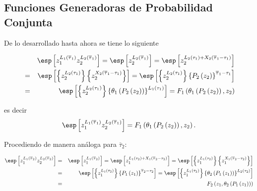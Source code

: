 \subsection{Funciones Generadoras de Probabilidad Conjunta}


De lo desarrollado hasta ahora se tiene lo siguiente

\begin{eqnarray*}
&&\esp\left[z_{1}^{L_{1}\left(\overline{\tau}_{1}\right)}z_{2}^{L_{2}\left(\overline{\tau}_{1}\right)}\right]=\esp\left[z_{2}^{L_{2}\left(\overline{\tau}_{1}\right)}\right]=\esp\left[z_{2}^{L_{2}\left(\tau_{1}\right)+X_{2}\left(\overline{\tau}_{1}-\tau_{1}\right)}\right]\\
&=&\esp\left[\left\{z_{2}^{L_{2}\left(\tau_{1}\right)}\right\}\left\{z_{2}^{X_{2}\left(\overline{\tau}_{1}-\tau_{1}\right)}\right\}\right]=\esp\left[\left\{z_{2}^{L_{2}\left(\tau_{1}\right)}\right\}\left\{P_{2}\left(z_{2}\right)\right\}^{\overline{\tau}_{1}-\tau_{1}}\right]\\
&=&\esp\left[\left\{z_{2}^{L_{2}\left(\tau_{1}\right)}\right\}\left\{\theta_{1}\left(P_{2}\left(z_{2}\right)\right)\right\}^{L_{1}\left(\tau_{1}\right)}\right]=F_{1}\left(\theta_{1}\left(P_{2}\left(z_{2}\right)\right),z_{2}\right)
\end{eqnarray*}

es decir %
\begin{equation}\label{Eq.base.F1}
\esp\left[z_{1}^{L_{1}\left(\overline{\tau}_{1}\right)}z_{2}^{L_{2}\left(\overline{\tau}_{1}\right)}\right]=F_{1}\left(\theta_{1}\left(P_{2}\left(z_{2}\right)\right),z_{2}\right).
\end{equation}

Procediendo de manera an\'aloga para $\overline{\tau}_{2}$:

\begin{eqnarray*}
\esp\left[z_{1}^{L_{1}\left(\overline{\tau}_{2}\right)}z_{2}^{L_{2}\left(\overline{\tau}_{2}\right)}\right]&=&\esp\left[z_{1}^{L_{1}\left(\overline{\tau}_{2}\right)}\right]=\esp\left[z_{1}^{L_{1}\left(\tau_{2}\right)+X_{1}\left(\overline{\tau}_{2}-\tau_{2}\right)}\right]=\esp\left[\left\{z_{1}^{L_{1}\left(\tau_{2}\right)}\right\}\left\{z_{1}^{X_{1}\left(\overline{\tau}_{2}-\tau_{2}\right)}\right\}\right]\\
&=&\esp\left[\left\{z_{1}^{L_{1}\left(\tau_{2}\right)}\right\}\left\{P_{1}\left(z_{1}\right)\right\}^{\overline{\tau}_{2}-\tau_{2}}\right]=\esp\left[\left\{z_{1}^{L_{1}\left(\tau_{2}\right)}\right\}\left\{\theta_{2}\left(P_{1}\left(z_{1}\right)\right)\right\}^{L_{2}\left(\tau_{2}\right)}\right]\\
&=&F_{2}\left(z_{1},\theta_{2}\left(P_{1}\left(z_{1}\right)\right)\right)
\end{eqnarray*}%


